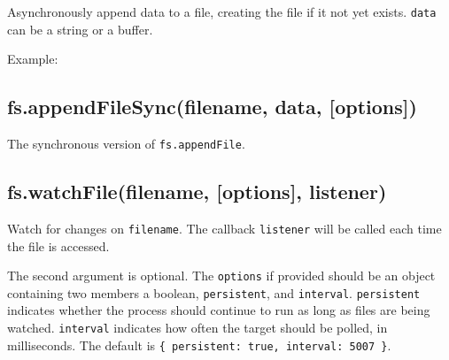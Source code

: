 Asynchronously append data to a file, creating the file if it not yet
exists. \texttt{data} can be a string or a buffer.

Example:

\begin{Shaded}
\begin{Highlighting}[]
\NormalTok{(}\NormalTok{, }\NormalTok{, } 
    
  \NormalTok{(}\NormalTok{);}
\NormalTok{\});}
\end{Highlighting}
\end{Shaded}

\subsection{fs.appendFileSync(filename, data,
{[}options{]})}\label{fs.appendfilesyncfilename-data-options}

The synchronous version of \texttt{fs.appendFile}.

\subsection{fs.watchFile(filename, {[}options{]},
listener)}\label{fs.watchfilefilename-options-listener}

\begin{Shaded}
\begin{Highlighting}[]
 \NormalTok{- }  \NormalTok{, } 
\end{Highlighting}
\end{Shaded}

Watch for changes on \texttt{filename}. The callback \texttt{listener}
will be called each time the file is accessed.

The second argument is optional. The \texttt{options} if provided should
be an object containing two members a boolean, \texttt{persistent}, and
\texttt{interval}. \texttt{persistent} indicates whether the process
should continue to run as long as files are being watched.
\texttt{interval} indicates how often the target should be polled, in
milliseconds. The default is
\texttt{\{ persistent: true, interval: 5007 \}}.

